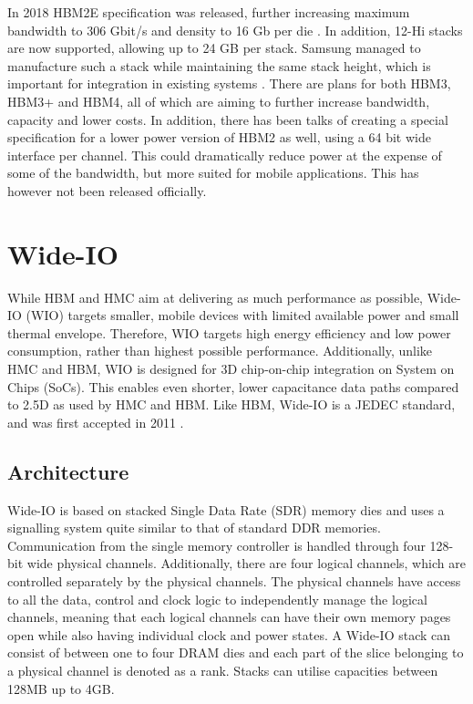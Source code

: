 In 2018 HBM2E specification was released, further increasing maximum bandwidth to 306 Gbit/s and density to 16 Gb per die \cite{standard2018highe}. In addition, 12-Hi stacks are now supported, allowing up to 24 GB per stack. Samsung managed to manufacture such a stack while maintaining the same stack height, which is important for integration in existing systems \cite{liu_2019}. There are plans for both HBM3, HBM3+ and HBM4, all of which are aiming to further increase bandwidth, capacity and lower costs. In addition, there has been talks of creating a special specification for a lower power version of HBM2 as well, using a 64 bit wide interface per channel. This could dramatically reduce power at the expense of some of the bandwidth, but more suited for mobile applications. This has however not been released officially. 


\section{Wide-IO}
While HBM and HMC aim at delivering as much performance as possible, Wide-IO (WIO) targets smaller, mobile devices with limited available power and small thermal envelope. Therefore, WIO targets high energy efficiency and low power consumption, rather than highest possible performance. Additionally, unlike HMC and HBM, WIO is designed for 3D chip-on-chip integration on System on Chips (SoCs). This enables even shorter, lower capacitance data paths compared to 2.5D as used by HMC and HBM. Like HBM, Wide-IO is a JEDEC standard, and was first accepted in 2011 \cite{standard2011wide}. 

\subsection{Architecture}
Wide-IO is based on stacked Single Data Rate (SDR) memory dies and uses a signalling system quite similar to that of standard DDR memories. Communication from the single memory controller is handled through four 128-bit wide physical channels. Additionally, there are four logical channels, which are controlled separately by the physical channels. The physical channels have access to all the data, control and clock logic to independently manage the logical channels, meaning that each logical channels can have their own memory pages open while also having individual clock and power states. A Wide-IO stack can consist of between one to four DRAM dies and each part of the slice belonging to a physical channel is denoted as a rank. Stacks can utilise capacities between 128MB up to 4GB. 
\bigskip

